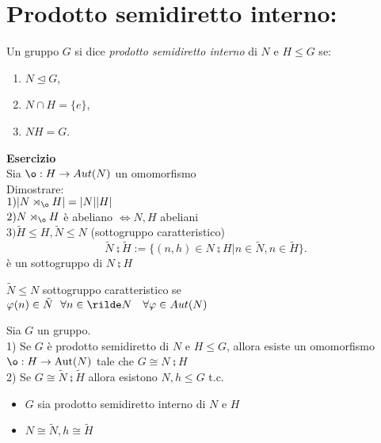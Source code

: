 \documentclass[12px]{article}
\begin{document}
\section{Prodotto semidiretto interno:}
Un gruppo \( G \) si dice \textit{prodotto semidiretto interno} di \( N \) e \( H \leq G \) se:
\begin{enumerate}
    \item \( N \trianglelefteq G \),
    \item \( N \cap H = \{ e \} \),
    \item \( N H = G \).
\end{enumerate}
\textbf{Esercizio}\\
Sia $\o : H \rightarrow Aut(N)$ un omomorfismo\\
Dimostrare:\\
$1) |N\rtimes_{\o} H | = |N||H|$\\
$2) N\rtimes_{\o} H$ è abeliano $ \Leftrightarrow N,H$ abeliani \\
$3) \tilde H \leq H, \tilde N \leq N$ (sottogruppo caratteristico)\\
 \[
\tilde N \semi \tilde H := \{ (n,h)\in N\semi H | 
	n\in \tilde N,
	n\in \tilde H
 \}
.\] 
è un sottogruppo di $N \semi H$\\
\begin{defi}
	$\tilde N\leq N$ sottogruppo caratteristico se \\$ \varphi(n)\in \tilde N\ \ \forall n\in \rilde N\ \ \ \forall \varphi\in Aut(N)$
\end{defi}
\begin{teo}
Sia \( G \) un gruppo. \\1) Se \( G \) è prodotto semidiretto di \( N \) e \( H \leq G \), allora esiste un omomorfismo \( \o : H \to \text{Aut}(N) \) tale che $G\cong N\semi H$\\
2) Se  $G\cong \tilde N\semi \tilde H$ allora esistono $N,h\leq G$ t.c.
\begin{itemize}
	\setlength\itemsep{-1em}
	\item $G$ sia prodotto semidiretto interno di $N$ e $H$ \\
	\item $N\cong \tilde N, h\cong \tilde H$
\end{itemize}
\end{teo}
\end{document}
